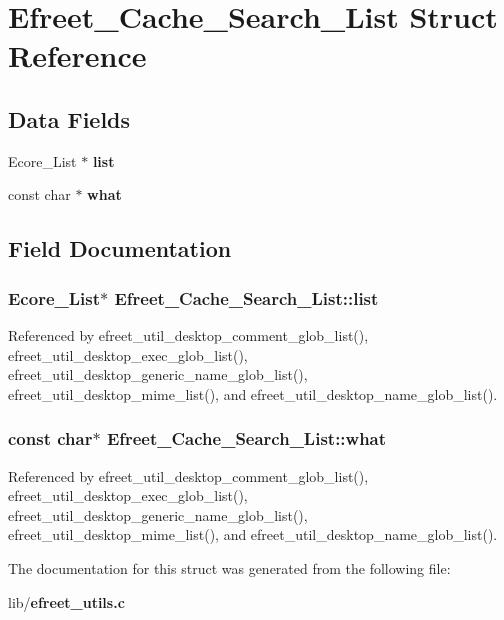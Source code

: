 \section{Efreet\_\-Cache\_\-Search\_\-List Struct Reference}
\label{structEfreet__Cache__Search__List}
\subsection*{Data Fields}
\begin{CompactItemize}
\item 
Ecore\_\-List $\ast$ {\bf list}
\item 
const char $\ast$ {\bf what}
\end{CompactItemize}


\subsection{Field Documentation}
\subsubsection[list]{\setlength{\rightskip}{0pt plus 5cm}Ecore\_\-List$\ast$ {\bf Efreet\_\-Cache\_\-Search\_\-List::list}}\label{structEfreet__Cache__Search__List_540358cecb676129e801ad8282242a9f}




Referenced by efreet\_\-util\_\-desktop\_\-comment\_\-glob\_\-list(), efreet\_\-util\_\-desktop\_\-exec\_\-glob\_\-list(), efreet\_\-util\_\-desktop\_\-generic\_\-name\_\-glob\_\-list(), efreet\_\-util\_\-desktop\_\-mime\_\-list(), and efreet\_\-util\_\-desktop\_\-name\_\-glob\_\-list().
\subsubsection[what]{\setlength{\rightskip}{0pt plus 5cm}const char$\ast$ {\bf Efreet\_\-Cache\_\-Search\_\-List::what}}\label{structEfreet__Cache__Search__List_532d1967d5a7ec19772db3eda8d1ade6}




Referenced by efreet\_\-util\_\-desktop\_\-comment\_\-glob\_\-list(), efreet\_\-util\_\-desktop\_\-exec\_\-glob\_\-list(), efreet\_\-util\_\-desktop\_\-generic\_\-name\_\-glob\_\-list(), efreet\_\-util\_\-desktop\_\-mime\_\-list(), and efreet\_\-util\_\-desktop\_\-name\_\-glob\_\-list().

The documentation for this struct was generated from the following file:\begin{CompactItemize}
\item 
lib/{\bf efreet\_\-utils.c}\end{CompactItemize}
